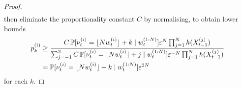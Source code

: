 \begin{proof}
\begin{align*}
\end{align*}
then eliminate the proportionality constant $C$ by normalising, to obtain lower bounds
\begin{align}
p_k^{(i)} 
&\geq \frac{ C \, \mathbb{P} [ \nu_t^{(i)} = \lfloor N w_t^{(i)} \rfloor + k \mid w_t^{(1:N)} ] 
        \varepsilon^N \prod_{j=1}^N h(X_{t-1}^{(j)}) }{
        \sum_{j=-1}^2 C \, \mathbb{P} [ \nu_t^{(i)} = \lfloor N w_t^{(i)} \rfloor + j \mid w_t^{(1:N)} ] 
        \varepsilon^{-N} \prod_{j=1}^N h(X_{t-1}^{(j)}) } \notag\\
&= \mathbb{P} [ \nu_t^{(i)} = \lfloor N w_t^{(i)} \rfloor + k \mid w_t^{(1:N)} ] \varepsilon^{2N} 
        \label{eq:strat_pbounds}
\end{align}
for each $k$.


\end{proof}
